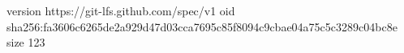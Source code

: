 version https://git-lfs.github.com/spec/v1
oid sha256:fa3606c6265de2a929d47d03cca7695c85f8094c9cbae04a75c5c3289c04bc8e
size 123
